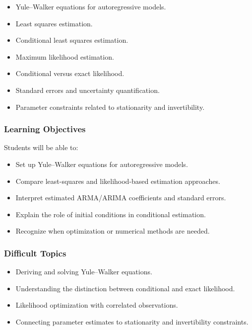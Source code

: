 \documentclass[11pt]{article}
\begin{document}
\begin{itemize}
    \item Yule--Walker equations for autoregressive models.
    \item Least squares estimation.
    \item Conditional least squares estimation.
    \item Maximum likelihood estimation.
    \item Conditional versus exact likelihood.
    \item Standard errors and uncertainty quantification.
    \item Parameter constraints related to stationarity and invertibility.
\end{itemize}

\subsubsection{Learning Objectives}

Students will be able to:

\begin{itemize}
    \item Set up Yule--Walker equations for autoregressive models.
    \item Compare least-squares and likelihood-based estimation approaches.
    \item Interpret estimated ARMA/ARIMA coefficients and standard errors.
    \item Explain the role of initial conditions in conditional estimation.
    \item Recognize when optimization or numerical methods are needed.
\end{itemize}

\subsubsection{Difficult Topics}

\begin{itemize}
    \item Deriving and solving Yule--Walker equations.
    \item Understanding the distinction between conditional and exact likelihood.
    \item Likelihood optimization with correlated observations.
    \item Connecting parameter estimates to stationarity and invertibility
    constraints.
\end{itemize}
\end{document}
